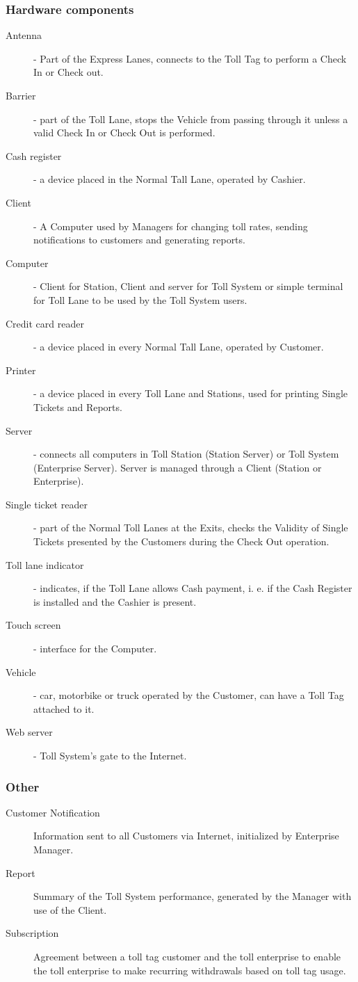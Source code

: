 \subsubsection{Hardware components}
\begin{description}

  \item[Antenna] - Part of the Express Lanes, connects to the Toll Tag to perform a Check In or Check out.
  \item[Barrier] - part of the Toll Lane, stops the Vehicle from passing through it unless a valid Check In or Check Out is performed.
  \item[Cash register] - a device placed in the Normal Tall Lane, operated by Cashier.
  \item[Client] - A Computer used by Managers for changing toll rates, sending notifications to customers and generating reports.
  \item[Computer] - Client for Station, Client and server for Toll System or simple terminal for Toll Lane to be used by the Toll System users.
  \item[Credit card reader] - a device placed in every Normal Tall Lane, operated by Customer.
  \item[Printer] - a device placed in every Toll Lane and Stations, used for printing Single Tickets and Reports.
  \item[Server] - connects all computers in Toll Station (Station Server) or Toll System (Enterprise Server). Server is managed through a Client (Station or Enterprise).
  \item[Single ticket reader] - part of the Normal Toll Lanes at the Exits, checks the Validity of Single Tickets presented by the Customers during the Check Out operation.
  \item[Toll lane indicator] - indicates, if the Toll Lane allows Cash payment, i. e. if the Cash Register is installed and the Cashier is present.
  \item[Touch screen] - interface for the Computer.
  \item[Vehicle] - car, motorbike or truck operated by the Customer, can have a Toll Tag attached to it.
  \item[Web server] - Toll System’s gate to the Internet.
\end{description}
\subsubsection{Other}
\begin{description}
  \item [Customer Notification] Information sent to all Customers via Internet, initialized by Enterprise Manager.
  \item[Report] Summary of the Toll System performance, generated by the Manager with use of the Client.
  \item[Subscription] Agreement between a toll tag customer and the toll enterprise to enable the toll enterprise to make recurring withdrawals based on toll tag usage.
\end{description}

